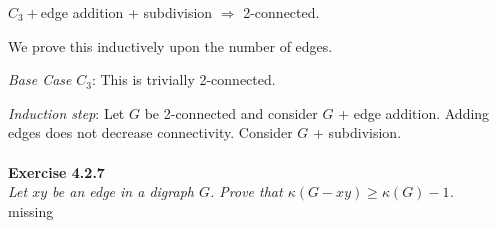 $C_{3} + $edge addition + subdivision \(\Rightarrow\) 2-connected.

We prove this inductively upon the number of edges.

\textit{Base Case} $C_{3}$: This is trivially 2-connected.

\textit{Induction step}: Let $G$ be 2-connected and consider $G$ + edge addition. Adding edges does not decrease connectivity. Consider $G$ + subdivision.
\\\\
\noindent
\textbf{Exercise 4.2.7 }\\
\noindent
\textit{Let $xy$ be an edge in a digraph $G$. Prove that $\kappa(G-xy) \ge \kappa(G) - 1$.}\\
missing
\\\\








